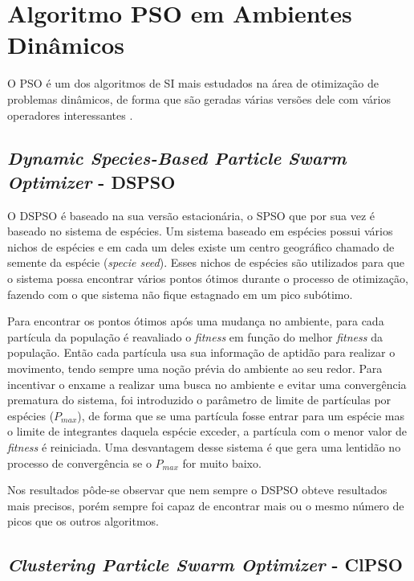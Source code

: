 \section{Algoritmo PSO em Ambientes Dinâmicos}
\label{sec:pso_behaviour}

O PSO é um dos algoritmos de SI mais estudados na área de otimização de problemas dinâmicos, de forma que são geradas várias versões dele com vários operadores interessantes \cite{carlisle2002applying}.

\subsection{\textit{Dynamic Species-Based Particle Swarm Optimizer} - DSPSO}
\label{sec:dspso}

O DSPSO \cite{parrott2006locating} é baseado na sua versão estacionária, o SPSO que por sua vez é baseado no sistema de espécies. Um sistema baseado em espécies possui vários nichos de espécies e em cada um deles existe um centro geográfico chamado de semente da espécie (\textit{specie seed}). Esses nichos de espécies são utilizados para que o sistema possa encontrar vários pontos ótimos durante o processo de otimização, fazendo com o que sistema não fique estagnado em um pico subótimo.

Para encontrar os pontos ótimos após uma mudança no ambiente, para cada partícula da população é reavaliado o \textit{fitness} em função do melhor \textit{fitness} da população. Então cada partícula usa sua informação de aptidão para realizar o movimento, tendo sempre uma noção prévia do ambiente ao seu redor. Para incentivar o enxame a realizar uma busca no ambiente e evitar uma convergência prematura do sistema, foi introduzido o parâmetro de limite de partículas por espécies ($P_{max}$), de forma que se uma partícula fosse entrar para um espécie mas o limite de integrantes daquela espécie exceder, a partícula com o menor valor de \textit{fitness} é reiniciada. Uma desvantagem desse sistema é que gera uma lentidão no processo de convergência se o $P_{max}$ for muito baixo.

Nos resultados pôde-se observar que nem sempre o DSPSO obteve resultados mais precisos, porém sempre foi capaz de encontrar mais ou o mesmo número de picos que os outros algoritmos.

\subsection{\textit{Clustering Particle Swarm Optimizer} - ClPSO}
\label{sec:cpso}

